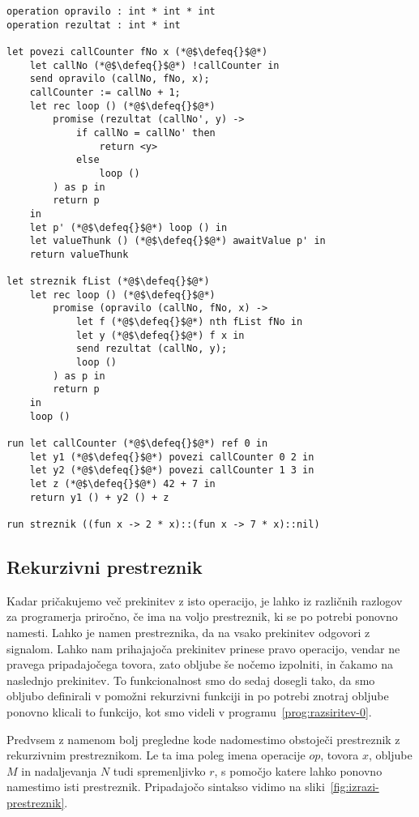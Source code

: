 \begin{lstlisting}[caption={Računanje zahtevne funkcije v ozadju.},label={prog:razsiritev-0},float,floatplacement=h]
operation opravilo : int * int * int
operation rezultat : int * int

let povezi callCounter fNo x (*@$\defeq{}$@*)
    let callNo (*@$\defeq{}$@*) !callCounter in
    send opravilo (callNo, fNo, x);
    callCounter := callNo + 1;
    let rec loop () (*@$\defeq{}$@*)
    	promise (rezultat (callNo', y) ->
    		if callNo = callNo' then
    			return <y>
    		else
    			loop ()
    	) as p in
    	return p
    in
    let p' (*@$\defeq{}$@*) loop () in
    let valueThunk () (*@$\defeq{}$@*) awaitValue p' in
    return valueThunk

let streznik fList (*@$\defeq{}$@*)
    let rec loop () (*@$\defeq{}$@*)
    	promise (opravilo (callNo, fNo, x) ->
    		let f (*@$\defeq{}$@*) nth fList fNo in
    		let y (*@$\defeq{}$@*) f x in
    		send rezultat (callNo, y);
    		loop ()
    	) as p in
    	return p
    in
    loop ()

run	let callCounter (*@$\defeq{}$@*) ref 0 in
    let y1 (*@$\defeq{}$@*) povezi callCounter 0 2 in
    let y2 (*@$\defeq{}$@*) povezi callCounter 1 3 in
    let z (*@$\defeq{}$@*) 42 + 7 in
    return y1 () + y2 () + z

run streznik ((fun x -> 2 * x)::(fun x -> 7 * x)::nil)
\end{lstlisting}


\subsection{Rekurzivni prestreznik}


Kadar pričakujemo več prekinitev z isto operacijo, je lahko iz različnih razlogov za programerja priročno, če ima na voljo prestreznik, ki se po potrebi ponovno namesti. Lahko je namen prestreznika, da na vsako prekinitev odgovori z signalom. Lahko nam prihajajoča prekinitev prinese pravo operacijo, vendar ne pravega pripadajočega tovora, zato obljube še nočemo izpolniti, in čakamo na naslednjo prekinitev.
To funkcionalnost smo do sedaj dosegli tako, da smo obljubo definirali v pomožni rekurzivni funkciji in po potrebi znotraj obljube ponovno klicali to funkcijo, kot smo videli v programu~\ref{prog:razsiritev-0}.

Predvsem z namenom bolj pregledne kode nadomestimo obstoječi prestreznik z rekurzivnim prestreznikom. Le ta ima poleg imena operacije $op$, tovora $x$, obljube $M$ in nadaljevanja $N$ tudi spremenljivko $r$, s pomočjo katere lahko ponovno namestimo isti prestreznik. Pripadajočo sintakso vidimo na sliki~\ref{fig:izrazi-prestreznik}.



